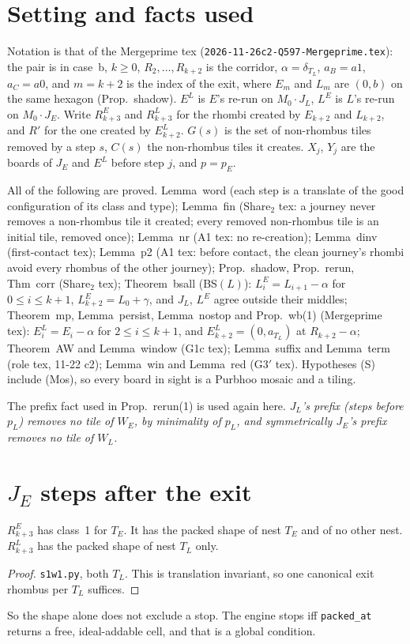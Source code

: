 \documentclass[11pt]{article}
\theoremstyle{remark}\newtheorem{remark}[theorem]{Remark}
\begin{document}
\section{Setting and facts used}
Notation is that of the Mergeprime tex (\texttt{2026-11-26c2-Q597-Mergeprime.tex}): the pair is in case~b, $k\ge0$, $R_2,\dots,R_{k+2}$ is the corridor, $\alpha=\delta_{T_L}$, $a_B=a1$, $a_C=a0$, and $m=k+2$ is the index of the exit, where $E_m$ and $L_m$ are $(0,b)$ on the same hexagon (Prop.~shadow). $E^L$ is $E$'s re-run on $M_0\cdot J_L$, $L^E$ is $L$'s re-run on $M_0\cdot J_E$. Write $R^E_{k+3}$ and $R^L_{k+3}$ for the rhombi created by $E_{k+2}$ and $L_{k+2}$, and $R'$ for the one created by $E^L_{k+2}$. $G(s)$ is the set of non-rhombus tiles removed by a step $s$, $C(s)$ the non-rhombus tiles it creates. $X_j$, $Y_j$ are the boards of $J_E$ and $E^L$ before step $j$, and $p=p_E$.

All of the following are proved.
Lemma~word (each step is a translate of the good configuration of its class and type);
Lemma~fin (Share$_2$ tex: a journey never removes a non-rhombus tile it created; every removed non-rhombus tile is an initial tile, removed once);
Lemma~nr (A1 tex: no re-creation);
Lemma~dinv (first-contact tex);
Lemma~p2 (A1 tex: before contact, the clean journey's rhombi avoid every rhombus of the other journey);
Prop.~shadow, Prop.~rerun, Thm~corr (Share$_2$ tex);
Theorem~bsall (BS$(L)$): $L^E_i=L_{i+1}-\alpha$ for $0\le i\le k+1$, $L^E_{k+2}=L_0+\gamma$, and $J_L$, $L^E$ agree outside their middles;
Theorem~mp, Lemma~persist, Lemma~nostop and Prop.~wb(1) (Mergeprime tex): $E^L_i=E_i-\alpha$ for $2\le i\le k+1$, and $E^L_{k+2}=(0,a_{T_L})$ at $R_{k+2}-\alpha$;
Theorem~AW and Lemma~window (G1c tex);
Lemma~suffix and Lemma~term (role tex, 11-22 c2);
Lemma~win and Lemma~red (G3$'$ tex).
Hypotheses (S) include (Mos), so every board in sight is a Purbhoo mosaic and a tiling.

The prefix fact used in Prop.~rerun(1) is used again here. \emph{$J_L$'s prefix (steps before $p_L$) removes no tile of $W_E$, by minimality of $p_L$, and symmetrically $J_E$'s prefix removes no tile of $W_L$.}

\section{$J_E$ steps after the exit}
\begin{lemma}\label{lem:shape}
$R^E_{k+3}$ has class~1 for $T_E$. It has the packed shape of nest $T_E$ and of no other nest. $R^L_{k+3}$ has the packed shape of nest $T_L$ only.
\end{lemma}
\begin{proof}
\texttt{s1w1.py}, both $T_L$. This is translation invariant, so one canonical exit rhombus per $T_L$ suffices.
\end{proof}
So the shape alone does not exclude a stop. The engine stops iff \texttt{packed\_at} returns a free, ideal-addable cell, and that is a global condition.
\end{document}
